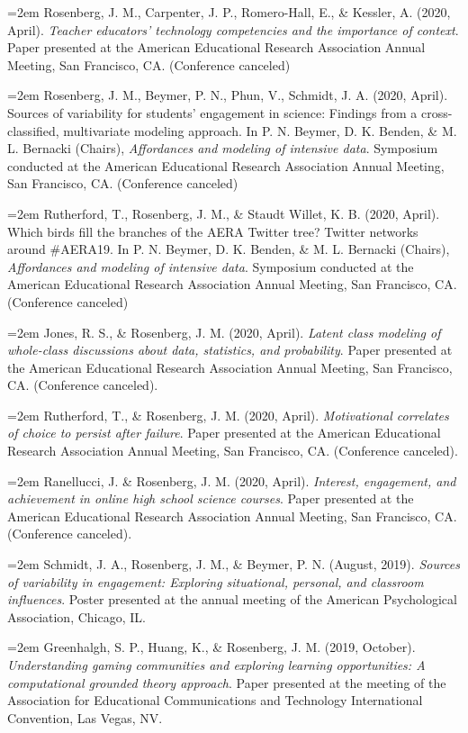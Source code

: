 \documentclass[
  14,
]{article}
\begin{document}
\hangindent=2em Rosenberg, J. M., Carpenter, J. P., Romero-Hall, E., \&
Kessler, A. (2020, April). \emph{Teacher educators' technology
competencies and the importance of context}. Paper presented at the
American Educational Research Association Annual Meeting, San Francisco,
CA. (Conference canceled)

\hangindent=2em Rosenberg, J. M., Beymer, P. N., Phun, V., Schmidt, J.
A. (2020, April). Sources of variability for students' engagement in
science: Findings from a cross-classified, multivariate modeling
approach. In P. N. Beymer, D. K. Benden, \& M. L. Bernacki (Chairs),
\emph{Affordances and modeling of intensive data}. Symposium conducted
at the American Educational Research Association Annual Meeting, San
Francisco, CA. (Conference canceled)

\hangindent=2em Rutherford, T., Rosenberg, J. M., \& Staudt Willet, K.
B. (2020, April). Which birds fill the branches of the AERA Twitter
tree? Twitter networks around \#AERA19. In P. N. Beymer, D. K. Benden,
\& M. L. Bernacki (Chairs), \emph{Affordances and modeling of intensive
data}. Symposium conducted at the American Educational Research
Association Annual Meeting, San Francisco, CA. (Conference canceled)

\hangindent=2em Jones, R. S., \& Rosenberg, J. M. (2020, April).
\emph{Latent class modeling of whole-class discussions about data,
statistics, and probability}. Paper presented at the American
Educational Research Association Annual Meeting, San Francisco, CA.
(Conference canceled).

\hangindent=2em Rutherford, T., \& Rosenberg, J. M. (2020, April).
\emph{Motivational correlates of choice to persist after failure}. Paper
presented at the American Educational Research Association Annual
Meeting, San Francisco, CA. (Conference canceled).

\hangindent=2em Ranellucci, J. \& Rosenberg, J. M. (2020, April).
\emph{Interest, engagement, and achievement in online high school
science courses}. Paper presented at the American Educational Research
Association Annual Meeting, San Francisco, CA. (Conference canceled).

\hangindent=2em Schmidt, J. A., Rosenberg, J. M., \& Beymer, P. N.
(August, 2019). \emph{Sources of variability in engagement: Exploring
situational, personal, and classroom influences}. Poster presented at
the annual meeting of the American Psychological Association, Chicago,
IL.

\hangindent=2em Greenhalgh, S. P., Huang, K., \& Rosenberg, J. M. (2019,
October). \emph{Understanding gaming communities and exploring learning
opportunities: A computational grounded theory approach}. Paper
presented at the meeting of the Association for Educational
Communications and Technology International Convention, Las Vegas, NV.
\end{document}
